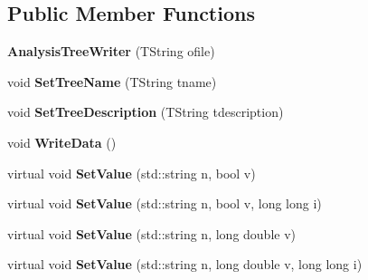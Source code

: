 \subsection*{Public Member Functions}
\begin{DoxyCompactItemize}
\item 
\hypertarget{class_h_a_l_1_1_analysis_tree_writer_abd4158739f239db9524aba10389b333e}{{\bfseries Analysis\-Tree\-Writer} (T\-String ofile)}\label{class_h_a_l_1_1_analysis_tree_writer_abd4158739f239db9524aba10389b333e}

\item 
\hypertarget{class_h_a_l_1_1_analysis_tree_writer_a278c9ceeb48e38c6a8f6307ebd953616}{void {\bfseries Set\-Tree\-Name} (T\-String tname)}\label{class_h_a_l_1_1_analysis_tree_writer_a278c9ceeb48e38c6a8f6307ebd953616}

\item 
\hypertarget{class_h_a_l_1_1_analysis_tree_writer_aa9aae5e8671c4b8c8c6042a7157d99ff}{void {\bfseries Set\-Tree\-Description} (T\-String tdescription)}\label{class_h_a_l_1_1_analysis_tree_writer_aa9aae5e8671c4b8c8c6042a7157d99ff}

\item 
\hypertarget{class_h_a_l_1_1_analysis_tree_writer_af49d85d3524d21a7da1a27d0a029239d}{void {\bfseries Write\-Data} ()}\label{class_h_a_l_1_1_analysis_tree_writer_af49d85d3524d21a7da1a27d0a029239d}

\item 
\hypertarget{class_h_a_l_1_1_analysis_tree_writer_a0a3671ddb4cc2cfe86f8246a4577905b}{virtual void {\bfseries Set\-Value} (std\-::string n, bool v)}\label{class_h_a_l_1_1_analysis_tree_writer_a0a3671ddb4cc2cfe86f8246a4577905b}

\item 
\hypertarget{class_h_a_l_1_1_analysis_tree_writer_a3a3369b3bb537391ce6981615389702e}{virtual void {\bfseries Set\-Value} (std\-::string n, bool v, long long i)}\label{class_h_a_l_1_1_analysis_tree_writer_a3a3369b3bb537391ce6981615389702e}

\item 
\hypertarget{class_h_a_l_1_1_analysis_tree_writer_a34f682dd09a3284c9b1baf394dd952e4}{virtual void {\bfseries Set\-Value} (std\-::string n, long double v)}\label{class_h_a_l_1_1_analysis_tree_writer_a34f682dd09a3284c9b1baf394dd952e4}

\item 
\hypertarget{class_h_a_l_1_1_analysis_tree_writer_a673a895e89bb0accd747a999b68d4538}{virtual void {\bfseries Set\-Value} (std\-::string n, long double v, long long i)}\label{class_h_a_l_1_1_analysis_tree_writer_a673a895e89bb0accd747a999b68d4538}


\end{DoxyCompactItemize}
